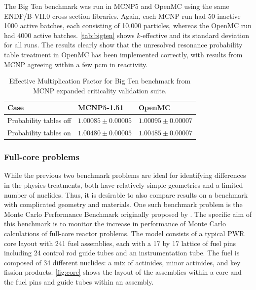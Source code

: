 \documentclass[authoryear,preprint]{elsarticle}
\begin{document}
The Big Ten benchmark was run in MCNP5 and OpenMC using the same ENDF/B-VII.0
cross section libraries. Again, each MCNP run had 50 inactive 1000 active
batches, each consisting of 10,000 particles, whereas the OpenMC run had 4000
active batches. \autoref{tab:bigten} shows $k$-effective and its standard
deviation for all runs. The results clearly show that the unresolved resonance
probability table treatment in OpenMC has been implemented correctly, with
results from MCNP agreeing within a few pcm in reactivity.

\begin{table}
  \caption{Effective Multiplication Factor for Big Ten benchmark from MCNP
    expanded criticality validation suite.}
  \label{tab:bigten}
  \begin{center}
  \begin{tabular}{ l l l }
    \toprule
    Case & MCNP5-1.51 & OpenMC \\
    \midrule
    Probability tables off & $1.00085 \pm 0.00005$ & $1.00095 \pm 0.00007$ \\
    Probability tables on  & $1.00480 \pm 0.00005$ & $1.00485 \pm 0.00007$ \\
    \bottomrule
  \end{tabular}
  \end{center}
\end{table}

\subsubsection{Full-core problems}

While the previous two benchmark problems are ideal for identifying differences
in the physics treatments, both have relatively simple geometries and a limited
number of nuclides. Thus, it is desirable to also compare results on a benchmark
with complicated geometry and materials. One such benchmark problem is the Monte
Carlo Performance Benchmark originally proposed by \citet{hoogenboom}. The
specific aim of this benchmark is to monitor the increase in performance of
Monte Carlo calculations of full-core reactor problems. The model consists of a
typical PWR core layout with 241 fuel assemblies, each with a 17 by 17 lattice
of fuel pins including 24 control rod guide tubes and an instrumentation
tube. The fuel is composed of 34 different nuclides: a mix of actinides, minor
actinides, and key fission products. \autoref{fig:core} shows the layout of the
assemblies within a core and the fuel pins and guide tubes within an assembly.
\end{document}
